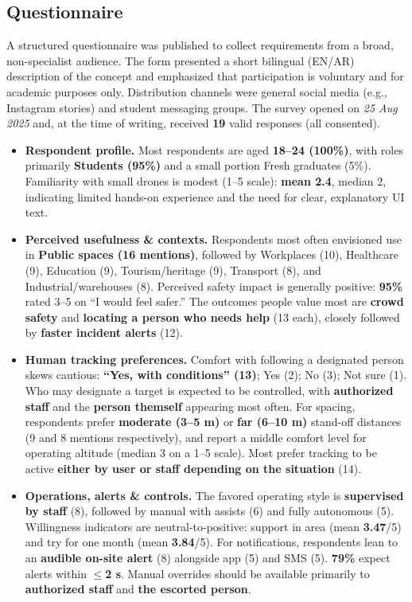 \documentclass[12pt,a4paper]{report}
\begin{document}
\subsection{Questionnaire}

A structured questionnaire was published to collect requirements from a broad, non-specialist audience. The form presented a short bilingual (EN/AR) description of the concept and emphasized that participation is voluntary and for academic purposes only. Distribution channels were general social media (e.g., Instagram stories) and student messaging groups. The survey opened on \textit{25 Aug 2025} and, at the time of writing, received \textbf{19} valid responses (all consented).

\begin{itemize}[leftmargin=*]
\item \textbf{Respondent profile.}
Most respondents are aged \textbf{18–24 (100\%)}, with roles primarily \textbf{Students (95\%)} and a small portion Fresh graduates (5\%). Familiarity with small drones is modest (1–5 scale): \textbf{mean 2.4}, median 2, indicating limited hands-on experience and the need for clear, explanatory \ac{UI} text.

\item \textbf{Perceived usefulness \& contexts.}
Respondents most often envisioned use in \textbf{Public spaces (16 mentions)}, followed by Workplaces (10), Healthcare (9), Education (9), Tourism/heritage (9), Transport (8), and Industrial/warehouses (8). Perceived safety impact is generally positive: \textbf{95\%} rated 3–5 on “I would feel safer.” The outcomes people value most are \textbf{crowd safety} and \textbf{locating a person who needs help} (13 each), closely followed by \textbf{faster incident alerts} (12).

\item \textbf{Human tracking preferences.}
Comfort with following a designated person skews cautious: \textbf{“Yes, with conditions” (13)}; Yes (2); No (3); Not sure (1). Who may designate a target is expected to be controlled, with \textbf{authorized staff} and the \textbf{person themself} appearing most often. For spacing, respondents prefer \textbf{moderate (3–5 m)} or \textbf{far (6–10 m)} stand-off distances (9 and 8 mentions respectively), and report a middle comfort level for operating altitude (median 3 on a 1–5 scale). Most prefer tracking to be active \textbf{either by user or staff depending on the situation} (14).

\item \textbf{Operations, alerts \& controls.}
The favored operating style is \textbf{supervised by staff} (8), followed by manual with assists (6) and fully autonomous (5). Willingness indicators are neutral-to-positive: support in area (mean \textbf{3.47}/5) and try for one month (mean \textbf{3.84}/5). For notifications, respondents lean to an \textbf{audible on-site alert} (8) alongside app (5) and \ac{SMS} (5). \textbf{79\%} expect alerts within \textbf{$\leq$2 s}. Manual overrides should be available primarily to \textbf{authorized staff} and \textbf{the escorted person}.


\end{itemize}
\end{document}
